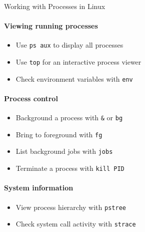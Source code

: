 \begin{KR}{Working with Processes in Linux}\\
    \paragraph{Viewing running processes}
    \begin{itemize}
        \item Use \texttt{ps aux} to display all processes
        \item Use \texttt{top} for an interactive process viewer
        \item Check environment variables with \texttt{env}
    \end{itemize}
    
    \paragraph{Process control}
    \begin{itemize}
        \item Background a process with \texttt{\&} or \texttt{bg}
        \item Bring to foreground with \texttt{fg}
        \item List background jobs with \texttt{jobs}
        \item Terminate a process with \texttt{kill PID}
    \end{itemize}
    
    \paragraph{System information}
    \begin{itemize}
        \item View process hierarchy with \texttt{pstree}
        \item Check system call activity with \texttt{strace}
    \end{itemize}
\end{KR}